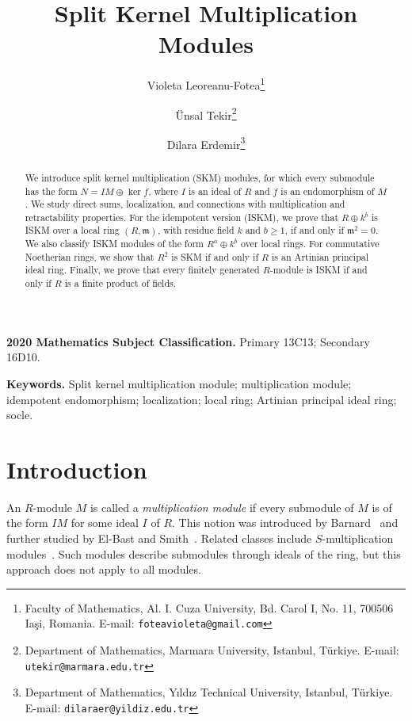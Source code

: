 \documentclass[11pt,a4paper]{article}
\theoremstyle{definition}
\theoremstyle{remark}
\begin{document}
\title{\textbf{Split Kernel Multiplication Modules}}
\author{Violeta Leoreanu-Fotea\thanks{%
Faculty of Mathematics, Al. I. Cuza University, Bd. Carol I, No. 11, 700506
Ia\c{s}i, Romania. E-mail: \texttt{foteavioleta@gmail.com}} \and \"{U}nsal
Tekir\thanks{%
Department of Mathematics, Marmara University, Istanbul, T\"urkiye. E-mail: 
\texttt{utekir@marmara.edu.tr}} \and Dilara Erdemir\thanks{%
Department of Mathematics, Y\i ld\i z Technical University, Istanbul,
T\"urkiye. E-mail: \texttt{dilaraer@yildiz.edu.tr}}}
\date{}
\maketitle


\begin{abstract}
We introduce split kernel multiplication (SKM) modules, for which every submodule has the form $N=IM\oplus\ker f$, where $I$ is an ideal of $R$ and $f$ is an endomorphism of $M$. We study direct sums, localization, and connections with multiplication and retractability properties. For the idempotent version (ISKM), we prove that $R\oplus k^b$ is ISKM over a local ring $(R,\mathfrak m)$, with residue field $k$ and $b\geq1$, if and only if $\mathfrak m^2=0$. We also classify ISKM modules of the form $R^a\oplus k^b$ over local rings. For commutative Noetherian rings, we show that $R^2$ is SKM if and only if $R$ is an Artinian principal ideal ring. Finally, we prove that every finitely generated $R$-module is ISKM if and only if $R$ is a finite product of fields.
\end{abstract}

\noindent\textbf{2020 Mathematics Subject Classification.}
Primary 13C13; Secondary 16D10.

\noindent\textbf{Keywords.}
Split kernel multiplication module; multiplication module;
idempotent endomorphism; localization; local ring;
Artinian principal ideal ring; socle.

\section{Introduction}

An $R$-module $M$ is called a \emph{multiplication module} if every submodule of $M$ is of the form $IM$ for some ideal $I$ of $R$. This notion was introduced by Barnard~\cite{Barnard} and further studied by El-Bast and Smith~\cite{ElBastSmith}. Related classes include $S$-multiplication modules~\cite{AndersonEtAl}. Such modules describe submodules through ideals of the ring, but this approach does not apply to all modules.
\end{document}
